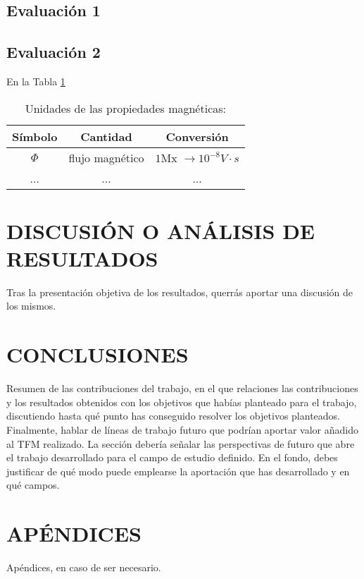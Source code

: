 \documentclass[11pt,a4paper,USenglish,twocolumn]{article}
\begin{document}
\subsection{Evaluación 1}

\subsection{Evaluación 2 }
En la Tabla \ref{tab_1}
\begin{table}\label{tab_1}
\caption{Unidades de las propiedades magnéticas:}

\begin{tabular}{ccc}\hline\hline
Símbolo & Cantidad & Conversión\\
\hline
$\Phi$ & flujo magnético & $1$Mx $\rightarrow 10^{-8}V\cdot s$\\
... &...&...\\
\hline\hline
\end{tabular}
\end{table}

\section{DISCUSIÓN O ANÁLISIS DE RESULTADOS}
Tras la presentación objetiva de los resultados, querrás aportar una discusión de los mismos.

\section{CONCLUSIONES}
Resumen de las contribuciones del trabajo, en el que relaciones las contribuciones y los resultados obtenidos con los objetivos que habías planteado para el trabajo, discutiendo hasta qué punto has conseguido resolver los objetivos planteados.
Finalmente, hablar de líneas de trabajo futuro que podrían aportar valor añadido al TFM realizado. La sección debería señalar las perspectivas de futuro que abre el trabajo desarrollado para el campo de estudio definido. En el fondo, debes justificar de qué modo puede emplearse la aportación que has desarrollado y en qué campos.

\appendix
\section{APÉNDICES}
Apéndices, en caso de ser necesario.



\end{document}

